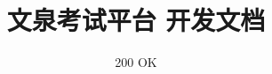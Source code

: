 \documentclass{article}
\title{文泉考试平台 开发文档}
\author{200 OK}
\date{}
\begin{document}
\maketitle

\section{}
\end{document}
